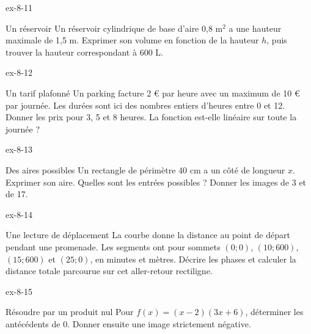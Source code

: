 \clearpage{}
\begin{blocLivre}{ex-8-11}\begin{exercice}[3]{Un réservoir}
Un réservoir cylindrique de base d’aire 0,8 m$^2$ a une hauteur maximale de 1,5 m. Exprimer son volume en fonction de la hauteur $h$, puis trouver la hauteur correspondant à 600 L.
\label{fig-ex-8-11}
\end{exercice}\end{blocLivre}
\begin{blocLivre}{ex-8-12}\begin{exercice}[3]{Un tarif plafonné}
Un parking facture 2 € par heure avec un maximum de 10 € par journée. Les durées sont ici des nombres entiers d’heures entre 0 et 12. Donner les prix pour 3, 5 et 8 heures. La fonction est-elle linéaire sur toute la journée ?
\end{exercice}\end{blocLivre}
\begin{blocLivre}{ex-8-13}\begin{exercice}[3]{Des aires possibles}
Un rectangle de périmètre 40 cm a un côté de longueur $x$. Exprimer son aire. Quelles sont les entrées possibles ? Donner les images de 3 et de 17.
\label{fig-ex-8-13}
\end{exercice}\end{blocLivre}
\begin{blocLivre}{ex-8-14}\begin{exercice}[3]{Une lecture de déplacement}
La courbe donne la distance au point de départ pendant une promenade. Les segments ont pour sommets $(0;0)$, $(10;600)$, $(15;600)$ et $(25;0)$, en minutes et mètres. Décrire les phases et calculer la distance totale parcourue sur cet aller-retour rectiligne.
\label{fig-ex-8-14}
\end{exercice}\end{blocLivre}
\begin{blocLivre}{ex-8-15}\begin{exercice}[3]{Résoudre par un produit nul}
Pour $f(x)=(x-2)(3x+6)$, déterminer les antécédents de 0. Donner ensuite une image strictement négative.
\end{exercice}\end{blocLivre}

\clearpage

